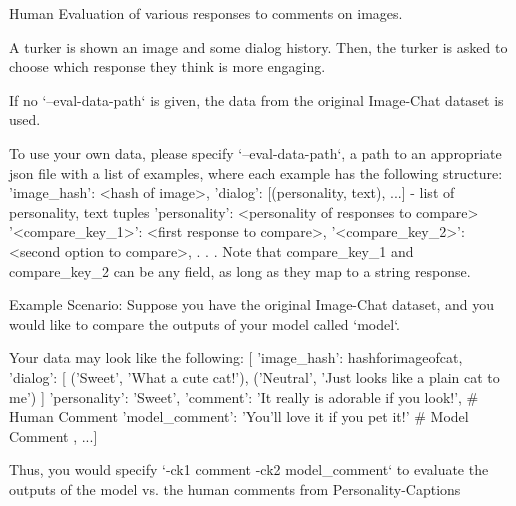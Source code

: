 \begin{DoxyVerb}    Human Evaluation of various responses to comments on images.

    A turker is shown an image and some dialog history. Then, the
    turker is asked to choose which response they think is more engaging.

    If no `--eval-data-path` is given, the data from the original
    Image-Chat dataset is used.

    To use your own data, please specify `--eval-data-path`, a path to an
    appropriate json file with a list of examples, where each example
    has the following structure:
        {
            'image_hash': <hash of image>,
            'dialog': [(personality, text), ...] - list of personality, text tuples
            'personality': <personality of responses to compare>
            '<compare_key_1>': <first response to compare>,
            '<compare_key_2>': <second option to compare>,
            .
            .
            .
        }
    Note that compare_key_1 and compare_key_2 can be any field, as long as they
    map to a string response.

    Example Scenario:
        Suppose you have the original Image-Chat dataset, and
        you would like to compare the outputs of your model called `model`.

        Your data may look like the following:
        [{
            'image_hash': hashforimageofcat,
            'dialog': [
                ('Sweet', 'What a cute cat!'),
                ('Neutral', 'Just looks like a plain cat to me')
            ]
            'personality': 'Sweet',
            'comment': 'It really is adorable if you look!', # Human Comment
            'model_comment': 'You'll love it if you pet it!' # Model Comment
        }, ...]

        Thus, you would specify `-ck1 comment -ck2 model_comment` to evaluate
        the outputs of the model vs. the human comments from Personality-Captions\end{DoxyVerb}



